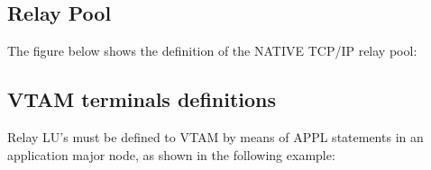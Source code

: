 \documentclass[letterpaper,10pt,english]{sphinxmanual}
\begin{document}
\ignorespaces 

\subsection{Relay Pool}
\label{\detokenize{connectivity_guide:relay-pool}}\label{\detokenize{connectivity_guide:index-38}}
The figure below shows the definition of the NATIVE TCP/IP relay pool:


\ignorespaces 

\subsection{VTAM terminals definitions}
\label{\detokenize{connectivity_guide:vtam-terminals-definitions}}\label{\detokenize{connectivity_guide:index-39}}
Relay LU’s must be defined to VTAM by means of APPL statements in an application major node, as shown in the following example:
\end{document}
